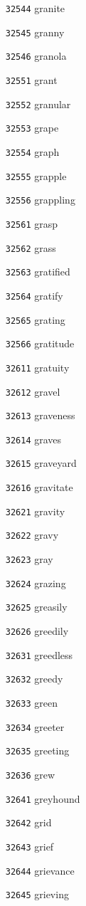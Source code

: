\documentclass[twoside,11pt]{article}
\begin{document}
\begin{multicols}{5}
\begin{enumerate}
\item[\texttt{32544}] granite
\item[\texttt{32545}] granny
\item[\texttt{32546}] granola
\item[\texttt{32551}] grant
\item[\texttt{32552}] granular
\item[\texttt{32553}] grape
\item[\texttt{32554}] graph
\item[\texttt{32555}] grapple
\item[\texttt{32556}] grappling
\item[\texttt{32561}] grasp
\item[\texttt{32562}] grass
\item[\texttt{32563}] gratified
\item[\texttt{32564}] gratify
\item[\texttt{32565}] grating
\item[\texttt{32566}] gratitude
\item[\texttt{32611}] gratuity
\item[\texttt{32612}] gravel
\item[\texttt{32613}] graveness
\item[\texttt{32614}] graves
\item[\texttt{32615}] graveyard
\item[\texttt{32616}] gravitate
\item[\texttt{32621}] gravity
\item[\texttt{32622}] gravy
\item[\texttt{32623}] gray
\item[\texttt{32624}] grazing
\item[\texttt{32625}] greasily
\item[\texttt{32626}] greedily
\item[\texttt{32631}] greedless
\item[\texttt{32632}] greedy
\item[\texttt{32633}] green
\item[\texttt{32634}] greeter
\item[\texttt{32635}] greeting
\item[\texttt{32636}] grew
\item[\texttt{32641}] greyhound
\item[\texttt{32642}] grid
\item[\texttt{32643}] grief
\item[\texttt{32644}] grievance
\item[\texttt{32645}] grieving

\end{enumerate}
\end{multicols}
\end{document}
